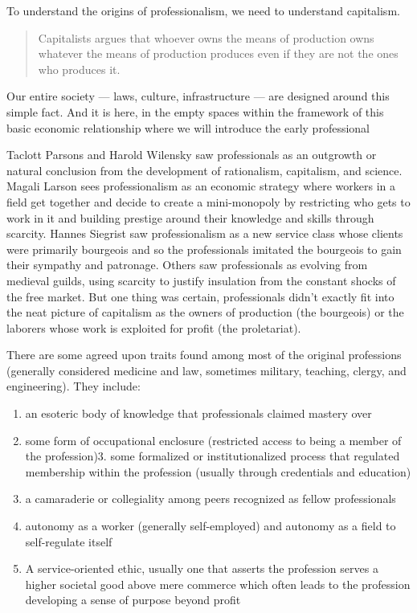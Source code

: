\documentclass[
]{book}
\providecommand{\tightlist}{%
  \setlength{\itemsep}{0pt}\setlength{\parskip}{0pt}}
\begin{document}
To understand the origins of professionalism, we need to
understand capitalism.

\begin{quote}
Capitalists argues that whoever owns the means of
production owns whatever the means of production
produces even if they are not the ones who produces it.
\end{quote}

Our entire society --- laws, culture, infrastructure --- are designed
around this simple fact. And it is here, in the empty spaces
within the framework of this basic economic relationship
where we will introduce the early professional

Taclott Parsons and Harold Wilensky saw professionals as an outgrowth or
natural conclusion from the development of rationalism,
capitalism, and science. Magali Larson sees professionalism
as an economic strategy where workers in a field get together
and decide to create a mini-monopoly by restricting who gets
to work in it and building prestige around their knowledge
and skills through scarcity. Hannes Siegrist saw
professionalism as a new service class whose clients were
primarily bourgeois and so the professionals imitated the
bourgeois to gain their sympathy and patronage. Others saw
professionals as evolving from medieval guilds, using scarcity
to justify insulation from the constant shocks of the free
market. But one thing was certain, professionals didn't
exactly fit into the neat picture of capitalism as the owners of
production (the bourgeois) or the laborers whose work is
exploited for profit (the proletariat).

There are some agreed
upon traits found among most of the original professions
(generally considered medicine and law, sometimes military,
teaching, clergy, and engineering). They include:

\begin{enumerate}
\def\labelenumi{\arabic{enumi}.}
\tightlist
\item
  an esoteric body of knowledge that professionals claimed
  mastery over
\item
  some form of occupational enclosure (restricted access to
  being a member of the profession)3. some formalized or institutionalized process that
  regulated membership within the profession (usually
  through credentials and education)
\item
  a camaraderie or collegiality among peers recognized as
  fellow professionals
\item
  autonomy as a worker (generally self-employed) and
  autonomy as a field to self-regulate itself
\item
  A service-oriented ethic, usually one that asserts the
  profession serves a higher societal good above mere
  commerce which often leads to the profession developing
  a sense of purpose beyond profit
\end{enumerate}
\end{document}
